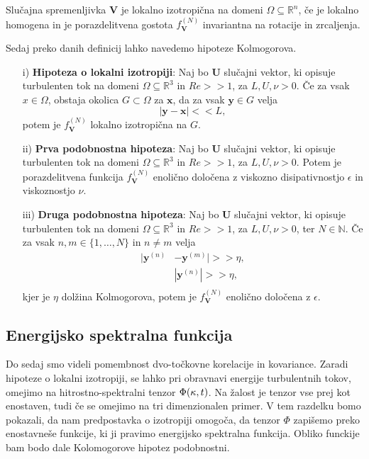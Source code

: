 \documentclass[mat2, tisk]{fmfdelo}
\newcommand{\R}{\mathbb R}
\newcommand{\N}{\mathbb N}
\newcommand{\bd}{\textbf}
\begin{document}
\begin{definicija}
Slučajna spremenljivka $\bd{V}$ je lokalno izotropična na domeni 
$\Omega \subseteq \R^n$, če je lokalno homogena in je porazdelitvena 
gostota $f_\bd{V}^{(N)}$ invariantna na rotacije in zrcaljenja.
\end{definicija}

Sedaj preko danih definicij lahko navedemo hipoteze Kolmogorova.

\begin{enumerate}
  \item[i)] \textbf{Hipoteza o lokalni izotropiji}: Naj bo $\bd{U}$ slučajni vektor,
  ki opisuje turbulenten tok na domeni $\Omega \subseteq \R^3$ in $Re >\!\!> 1$, za $L, U, \nu > 0$. Če 
  za vsak $x\in \Omega$, obstaja okolica $G \subset \Omega$ za $\bd{x}$, da za vsak 
  $\bd{y}\in G$ velja $$ |\bd{y} - \bd{x}| <\!\!< L,$$ potem je $f_\bd{V}^{(N)}$ lokalno 
  izotropična na $G$.
  \item[ii)] \textbf{Prva podobnostna hipoteza}: Naj bo $\bd{U}$ slučajni vektor,
  ki opisuje turbulenten tok na domeni $\Omega \subseteq \R^3$ in $Re >\!\!> 1$, za $L, U, \nu > 0$.
  Potem je porazdelitvena funkcija $f_\bd{V}^{(N)}$ enolično določena 
  z viskozno disipativnostjo $\epsilon$ in viskoznostjo $\nu$.
  \item[iii)] \textbf{Druga podobnostna hipoteza}: Naj bo $\bd{U}$ slučajni vektor,
  ki opisuje turbulenten tok na domeni $\Omega \subseteq \R^3$ in $Re >\!\!> 1$, za $L, U, \nu > 0$, ter $N\in \N$.
  Če za vsak $n, m \in \{1, \dots, N\}$ in $n\neq m$ velja 
  \begin{align*}
  |\bd{y}^{(n)} &- \bd{y}^{(m)}| >\!\!> \eta,\\
  &|\bd{y}^{(n)}|>\!\!> \eta, \\
\end{align*}
kjer je $\eta$ dolžina  Kolmogorova, potem je $f_\bd{V}^{(N)}$ enolično 
določena z $\epsilon$.
\end{enumerate}

\subsection{Energijsko spektralna funkcija}

Do sedaj smo videli pomembnost dvo-točkovne korelacije in kovariance. 
Zaradi hipoteze o lokalni izotropiji, se lahko pri obravnavi 
energije turbulentnih tokov, omejimo na hitrostno-spektralni tenzor $\Phi(\text{\bd{$\kappa$}}, t)$. 
Na žalost je tenzor vse prej kot enostaven, tudi če se omejimo na tri dimenzionalen primer. V tem razdelku bomo pokazali, 
da nam predpostavka o izotropiji omogoča, da tenzor $\Phi$ zapišemo 
preko enostavneše funkcije, ki ji pravimo energijsko spektralna funkcija.
Obliko funckije bam bodo dale Kolomogorove hipotez podobnostni. 
\end{document}
